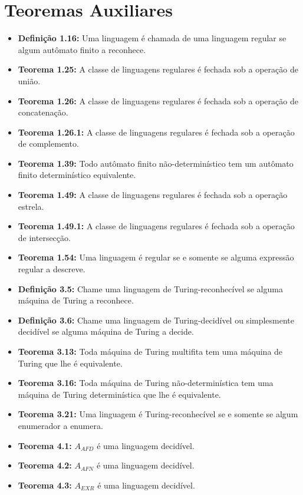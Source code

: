 \documentclass[12pt,a4paper,oneside]{article}
\begin{document}
\section*{Teoremas Auxiliares}

\begin{itemize}
	
	\item[] {\bf Definição 1.16:} Uma linguagem é chamada de uma linguagem regular se algum autômato finito a reconhece.
	\item[] {\bf Teorema 1.25:} A classe de linguagens regulares é fechada sob a operação de união.
	\item[] {\bf Teorema 1.26:} A classe de linguagens regulares é fechada sob a operação de concatenação.
	\item[] {\bf Teorema 1.26.1:} A classe de linguagens regulares é fechada sob a operação de complemento.
	\item[] {\bf Teorema 1.39:} Todo autômato finito não-determinístico tem um autômato finito determinístico
	equivalente.
	\item[] {\bf Teorema 1.49:} A classe de linguagens regulares é fechada sob a operação estrela.
	\item[] {\bf Teorema 1.49.1:} A classe de linguagens regulares é fechada sob a operação de intersecção.
	\item[] {\bf Teorema 1.54:} Uma linguagem é regular se e somente se alguma expressão regular a descreve.
	\item[] {\bf Definição 3.5:} Chame uma linguagem de Turing-reconhecível se alguma máquina de Turing a reconhece.
	\item[] {\bf Definição 3.6:} Chame uma linguagem de Turing-decidível ou simplesmente decidível se alguma máquina de Turing a decide.
	\item[] {\bf Teorema 3.13:} Toda máquina de Turing multifita tem uma máquina de Turing que lhe é equivalente.
	\item[] {\bf Teorema 3.16:} Toda máquina de Turing não-determinística tem uma máquina de Turing determinística que lhe é equivalente.
	\item[] {\bf Teorema 3.21:} Uma linguagem é Turing-reconhecível se e somente se algum enumerador a enumera.
	\item[] {\bf Teorema 4.1:} $A_{AFD}$ é uma linguagem decidível.
	\item[] {\bf Teorema 4.2:} $A_{AFN}$ é uma linguagem decidível.
	\item[] {\bf Teorema 4.3:} $A_{EXR}$ é uma linguagem decidível.

\end{itemize}
\end{document}
